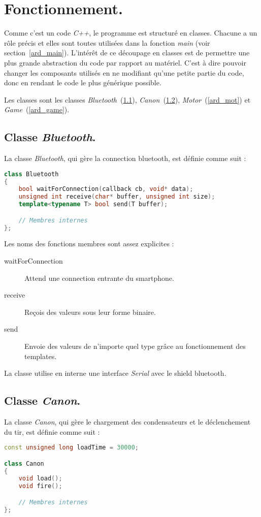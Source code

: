 \section{Fonctionnement.}
Comme c'est un code \emph{C++}, le programme est structuré en classes. Chacune a un rôle précis et elles sont toutes utilisées dans la fonction \emph{main} (voir section~\ref{ard_main}). L'intérêt de ce découpage en classes est de permettre une plus grande abstraction du code par rapport au matériel. C'est à dire pouvoir changer les composants utilisés en ne modifiant qu'une petite partie du code, donc en rendant le code le plus générique possible.

Les classes sont les classes \emph{Bluetooth}~(\ref{ard_bt}), \emph{Canon}~(\ref{ard_can}), \emph{Motor}~(\ref{ard_mot}) et \emph{Game}~(\ref{ard_game}).

\subsection{Classe \emph{Bluetooth}.} \label{ard_bt}
La classe \emph{Bluetooth}, qui gère la connection bluetooth, est définie comme suit :
\begin{lstlisting}[language=C++]
class Bluetooth
{
	bool waitForConnection(callback cb, void* data);
	unsigned int receive(char* buffer, unsigned int size);
	template<typename T> bool send(T buffer);

	// Membres internes
};
\end{lstlisting}

Les noms des fonctions membres sont assez explicites :\begin{description}
	\item[waitForConnection] Attend une connection entrante du smartphone.
	\item[receive] Reçois des valeurs sous leur forme binaire.
	\item[send] Envoie des valeurs de n'importe quel type grâce au fonctionnement des templates.
\end{description}

La classe utilise en interne une interface \emph{Serial} avec le shield bluetooth.

\subsection{Classe \emph{Canon}.} \label{ard_can}
La classe \emph{Canon}, qui gère le chargement des condensateurs et le déclenchement du tir, est définie comme suit :
\begin{lstlisting}[language=C++]
const unsigned long loadTime = 30000;

class Canon
{
	void load();
	void fire();

	// Membres internes
};
\end{lstlisting}

